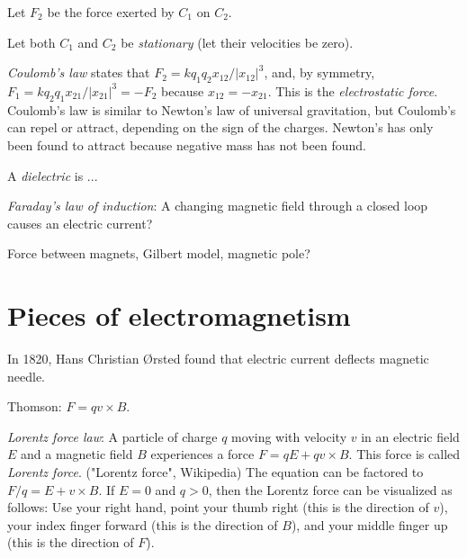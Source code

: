 Let \( F_2 \) be the force exerted by \(C_1\) on \(C_2\).

Let both \(C_1\) and \(C_2\) be \emph{stationary} (let their velocities be zero).

\emph{Coulomb's law} states that \( F_2 = k q_1 q_2 x_{12} / |x_{12}|^3 \),
and, by symmetry, \( F_1 = k q_2 q_1 x_{21} / |x_{21}|^3 = -F_2 \) because \( x_{12} = -x_{21} \).
This is the \emph{electrostatic force}.
Coulomb's law is similar to Newton's law of universal gravitation,
but Coulomb's can repel or attract, depending on the sign of the charges.
Newton's has only been found to attract because negative mass has not been found.

A \emph{dielectric} is ...



\emph{Faraday's law of induction}:
A changing magnetic field through a closed loop causes an electric current?

Force between magnets, Gilbert model, magnetic pole?

\section{Pieces of electromagnetism}


In 1820, Hans Christian {\O}rsted found that electric current deflects magnetic needle.

Thomson: \(F = q v \times B\).

\emph{Lorentz force law}:
A particle of charge \(q\) moving with velocity \(v\)
in an electric field \(E\) and a magnetic field \(B\)
experiences a force \( F = q E + q v \times B \).
This force is called \emph{Lorentz force}.
("Lorentz force", Wikipedia)
The equation can be factored to \( F/q = E + v \times B \).
If \(E = 0\) and \(q > 0\), then the Lorentz force can be visualized as follows:
Use your right hand, point your thumb right (this is the direction of \(v\)),
your index finger forward (this is the direction of \(B\)),
and your middle finger up (this is the direction of \(F\)).

